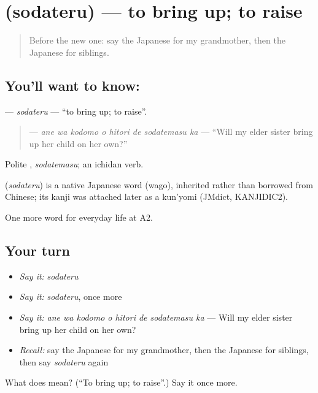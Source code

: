 \section[\texorpdfstring{\ja{そだてる} (sodateru)}{そだてる (sodateru)}]{ (sodateru) — to bring up; to raise}

\label{lesson:JA-C243-sodateru}



\begin{quote}
Before the new one: say the Japanese for my grandmother, then the Japanese for siblings.
\end{quote}

\subsection*{You'll want to know: }
\textbf{} — \emph{sodateru} — \textquotedblleft{}to bring up; to raise\textquotedblright{}.

\begin{quote}
\textbf{   } — \emph{ane wa kodomo o hitori de sodatemasu ka} — \textquotedblleft{}Will my elder sister bring up her child on her own?\textquotedblright{}
\end{quote}

Polite \textbf{}, \emph{sodatemasu}; an ichidan verb.

\begin{cousinweb}
\textbf{} (\emph{sodateru}) is a native Japanese word (wago), inherited rather than borrowed from Chinese; its kanji was attached later as a kun'yomi (JMdict, KANJIDIC2).
\end{cousinweb}

\begin{grammarlens}[title={What you've built}]
One more word for everyday life at A2.
\end{grammarlens}

\subsection*{Your turn}
\begin{itemize}
\raggedright
  \item \emph{Say it:} \emph{sodateru}
  \item \emph{Say it:} \emph{sodateru}, once more
  \item \emph{Say it:} \emph{ane wa kodomo o hitori de sodatemasu ka} — Will my elder sister bring up her child on her own?
  \item \emph{Recall:} say the Japanese for my grandmother, then the Japanese for siblings, then say \emph{sodateru} again
\end{itemize}

\begin{tcolorbox}[breakable,colback=teal!4,colframe=teal!35!black,title={Before you move on}]
What does  mean? (\textquotedblleft{}To bring up; to raise\textquotedblright{}.) Say it once more.
\end{tcolorbox}
